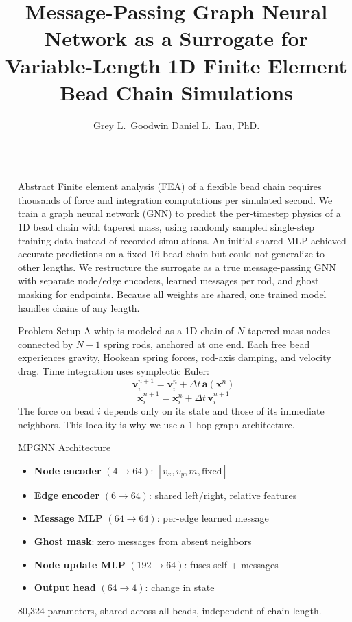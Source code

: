 \documentclass[final]{beamer}
\title{Message-Passing Graph Neural Network as a Surrogate for Variable-Length 1D Finite Element Bead Chain Simulations}
\author{Grey L.~Goodwin \quad\textbf{\textperiodcentered}\quad Daniel L.~Lau, PhD.}
\newlength{\sepwidth}
\newlength{\colwidth}
\newcommand{\separatorcolumn}{\begin{column}{\sepwidth}\end{column}}
\begin{document}
\begin{frame}[t]
\begin{columns}[t]
\separatorcolumn

\begin{column}{\colwidth}

  \begin{block}{Abstract}
    Finite element analysis (FEA) of a flexible bead chain requires
    thousands of force and integration computations per simulated second.
    We train a graph neural network (GNN) to predict the per-timestep
    physics of a 1D bead chain with tapered mass, using randomly sampled
    single-step training data instead of recorded simulations. An initial
    shared MLP achieved accurate predictions on a fixed 16-bead chain but
    could not generalize to other lengths. We restructure the surrogate as
    a true message-passing GNN with separate node/edge encoders, learned
    messages per rod, and ghost masking for endpoints. Because all weights
    are shared, one trained model handles chains of any length.
  \end{block}

  \begin{block}{Problem Setup}
    A whip is modeled as a 1D chain of $N$ tapered mass nodes connected
    by $N-1$ spring rods, anchored at one end. Each free bead experiences
    gravity, Hookean spring forces, rod-axis damping, and velocity drag.
    Time integration uses symplectic Euler:
    \begin{equation}
        \mathbf{v}_i^{n+1} = \mathbf{v}_i^n + \Delta t \, \mathbf{a}(\mathbf{x}^n)
    \end{equation}
    \begin{equation}
        \mathbf{x}_i^{n+1} = \mathbf{x}_i^n + \Delta t \, \mathbf{v}_i^{n+1}
    \end{equation}
    The force on bead $i$ depends only on its state and those of its
    immediate neighbors. This locality is why we use a 1-hop graph
    architecture.
  \end{block}

  \begin{block}{MPGNN Architecture}
    \begin{itemize}
      \item \textbf{Node encoder} $(4 \to 64)$: $[v_x, v_y, m, \text{fixed}]$
      \item \textbf{Edge encoder} $(6 \to 64)$: shared left/right, relative features
      \item \textbf{Message MLP} $(64 \to 64)$: per-edge learned message
      \item \textbf{Ghost mask}: zero messages from absent neighbors
      \item \textbf{Node update MLP} $(192 \to 64)$: fuses self + messages
      \item \textbf{Output head} $(64 \to 4)$: change in state
    \end{itemize}
    80{,}324 parameters, shared across all beads, independent of chain
    length.
  \end{block}


\end{column}
\end{columns}
\end{frame}
\end{document}
